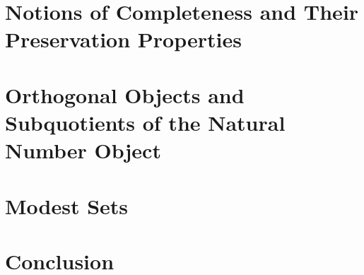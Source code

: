 \documentclass[12pt]{amsart}
\begin{document}
\section{Notions of Completeness and Their Preservation Properties}\label{sec:completeness}
\section{Orthogonal Objects and Subquotients of the Natural Number Object}\label{sec:orth}
\section{Modest Sets}\label{sec:modest}
\section{Conclusion}\label{sec:conclusion}


{}
\end{document}
